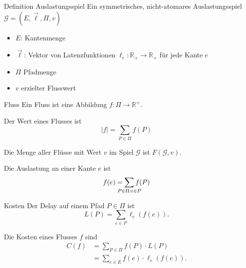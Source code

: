 \documentclass{beamer}
\begin{document}
\begin{frame}{Definition Auslastungsspiel}
	Ein symmetrisches, nicht-atomares \alert{Auslastungsspiel} $\mathcal G = (E, \vec{\ell}, \Pi, v)$
	\begin{itemize}
		\item $E$: Kantenmenge
		\item $\vec{\ell}$: Vektor von Latenzfunktionen $\ell_e : \mathbb R_+ \to \mathbb R_+$ für jede Kante $e$
		\item $\Pi$ Pfadmenge
		\item $v$ erzielter Flusswert
	\end{itemize}
\end{frame}

\begin{frame}{Fluss}
	Ein \alert{Fluss} ist eine Abbildung $f: \Pi \to \mathbb R^+$. 
	
	Der \alert{Wert} eines Flusses ist \[ |{f}| = \sum_{P \in \Pi} f(P) \]
	
	Die Menge aller Flüsse mit Wert $v$ im Spiel $\mathcal G$ ist $F(\mathcal G, v)$.
	
	Die Auslastung an einer Kante $e$ ist \[ f(e) = \sum_{\mathclap{P \in \Pi: e \in P}} f(P) \]
\end{frame}

\begin{frame}{Kosten}
	Der \alert{Delay} auf einem Pfad $P \in \Pi$ ist
	\[ L(P) = \sum_{e \in P} \ell_e\left(f\left(e\right)\right). \]
	
	Die \alert{Kosten} eines Flusses $f$ sind
	\begin{align*}
		C(f) &= \sum_{P \in \Pi} f(P) \cdot L(P) \\
			&= \sum_{e \in E} f(e) \cdot \ell_e\left(f\left(e\right)\right). 
	\end{align*} 
\end{frame}
\end{document}
